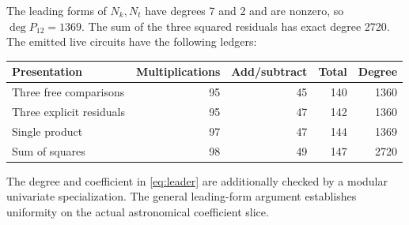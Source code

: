 The leading forms of $N_k,N_t$ have degrees 7 and 2 and are nonzero, so
$\deg P_{12}=1369$. The sum of the three squared residuals has exact degree
2720. The emitted live circuits have the following ledgers:
\begin{center}\small
\begin{tabular}{lrrrr}
\toprule
Presentation & Multiplications & Add/subtract & Total & Degree\\
\midrule
Three free comparisons &95&45&140&1360\\
Three explicit residuals &95&47&142&1360\\
Single product &97&47&144&1369\\
Sum of squares &98&49&147&2720\\
\bottomrule
\end{tabular}
\end{center}
The degree and coefficient in \eqref{eq:leader} are additionally checked
by a modular univariate specialization. The general leading-form argument
establishes uniformity on the actual astronomical coefficient slice.
